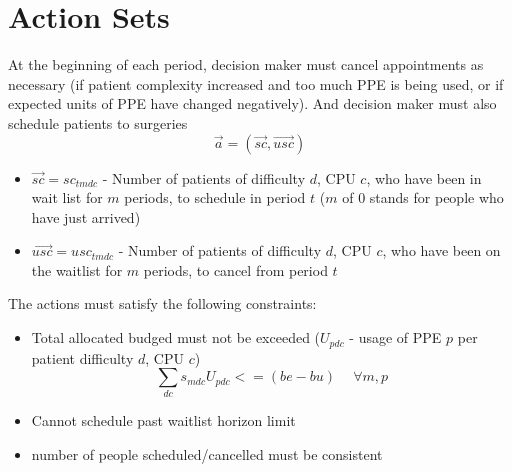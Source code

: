 \documentclass{article}
\begin{document}
\section{Action Sets}
At the beginning of each period, decision maker must cancel appointments as necessary (if patient complexity increased and too much PPE is being used, or if expected units of PPE have changed negatively). And decision maker must also schedule patients to surgeries
\[ \vec{a} = (\vec{sc}, \vec{usc}) \]
\begin{itemize}
    \item $\vec{sc} = sc_{tmdc}$ - Number of patients of difficulty $d$, CPU $c$, who have been in wait list for $m$ periods, to schedule in period $t$ ($m$ of 0 stands for people who have just arrived)
	\item $\vec{usc} = usc_{tmdc}$ - Number of patients of difficulty $d$, CPU $c$, who have been on the waitlist for $m$ periods, to cancel from period $t$
\end{itemize}
The actions must satisfy the following constraints:
\begin{itemize}
    \item Total allocated budged must not be exceeded ($U_{pdc}$ - usage of PPE $p$ per patient difficulty $d$, CPU $c$)
        \[ \sum_{dc}s_{mdc}U_{pdc} <= (be - bu)\ \quad \forall m, p \]
	\item Cannot schedule past waitlist horizon limit
	\item number of people scheduled/cancelled must be consistent
\end{itemize}
\end{document}

